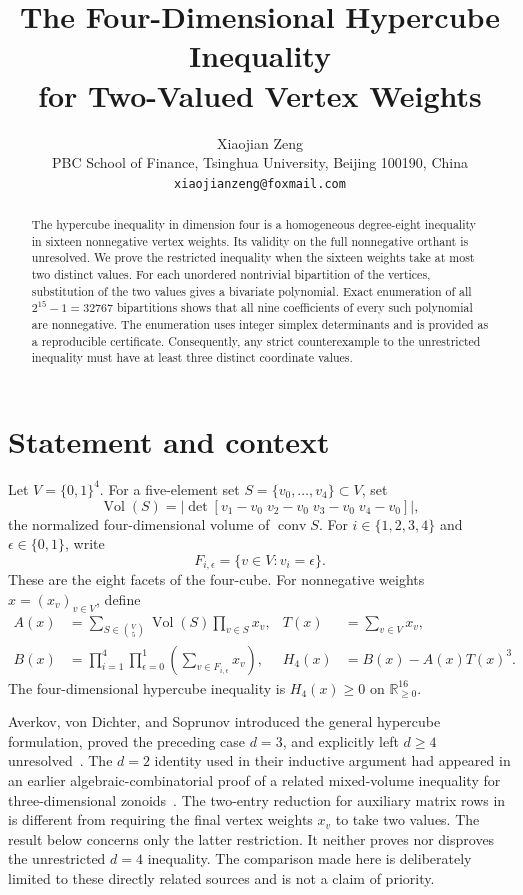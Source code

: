 \documentclass[11pt]{article}
\title{The Four-Dimensional Hypercube Inequality\\
for Two-Valued Vertex Weights}
\author{Xiaojian Zeng\\
\small PBC School of Finance, Tsinghua University, Beijing 100190, China\\
\small \texttt{xiaojianzeng@foxmail.com}}
\date{}
\newcommand{\cube}{\{0,1\}^{4}}
\begin{document}
\maketitle

\begin{abstract}
The hypercube inequality in dimension four is a homogeneous degree-eight
inequality in sixteen nonnegative vertex weights.  Its validity on the full
nonnegative orthant is unresolved.  We prove the restricted inequality when
the sixteen weights take at most two distinct values.  For each unordered
nontrivial bipartition of the vertices, substitution of the two values gives
a bivariate polynomial.  Exact enumeration of all $2^{15}-1=32767$
bipartitions shows that all nine coefficients of every such polynomial are
nonnegative.  The enumeration uses integer simplex determinants and is
provided as a reproducible certificate.  Consequently, any strict
counterexample to the unrestricted inequality must have at least three
distinct coordinate values.
\end{abstract}

\section{Statement and context}

Let $V=\cube$.  For a five-element set
$S=\{v_0,\ldots,v_4\}\subset V$, set
\[
 \operatorname{Vol}(S)
 =\left|\det[v_1-v_0\;v_2-v_0\;v_3-v_0\;v_4-v_0]\right|,
\]
the normalized four-dimensional volume of $\operatorname{conv}S$.  For
$i\in\{1,2,3,4\}$ and $\epsilon\in\{0,1\}$, write
\[
 F_{i,\epsilon}=\{v\in V:v_i=\epsilon\}.
\]
These are the eight facets of the four-cube.  For nonnegative weights
$x=(x_v)_{v\in V}$, define
\begin{align*}
 A(x)&=\sum_{S\in\binom V5}\operatorname{Vol}(S)
       \prod_{v\in S}x_v, &
 T(x)&=\sum_{v\in V}x_v,\\
 B(x)&=\prod_{i=1}^{4}\prod_{\epsilon=0}^{1}
       \left(\sum_{v\in F_{i,\epsilon}}x_v\right), &
 H_4(x)&=B(x)-A(x)T(x)^3.
\end{align*}
The four-dimensional hypercube inequality is $H_4(x)\geq0$ on
$\mathbb R_{\geq0}^{16}$.

Averkov, von Dichter, and Soprunov introduced the general hypercube
formulation, proved the preceding case $d=3$, and explicitly left $d\geq4$
unresolved~\cite{AverkovVonDichterSoprunov2026}.  The $d=2$ identity used in
their inductive argument had appeared in an earlier algebraic-combinatorial
proof of a related mixed-volume inequality for three-dimensional
zonoids~\cite{AverkovSoprunov2026}.  The two-entry reduction for auxiliary
matrix rows in
\cite[Section~4.2]{AverkovVonDichterSoprunov2026} is different from requiring
the final vertex weights $x_v$ to take two values.  The result below concerns
only the latter restriction.  It neither proves nor disproves the
unrestricted $d=4$ inequality.  The comparison made here is deliberately
limited to these directly related sources and is not a claim of priority.
\end{document}
